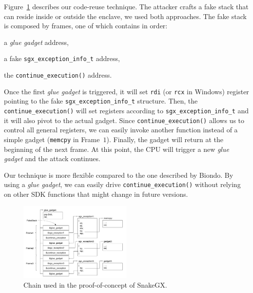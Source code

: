 Figure~\ref{fig:flavio-enclave-chain} describes our code-reuse technique.
The attacker crafts a fake stack that can reside inside or outside the enclave,
we used both approaches. The fake stack is composed by frames, one of which contains in order:
\begin{enumerate*}[label=(\roman*)]
	\item a \emph{glue gadget} address,
	\item a fake \texttt{sgx\_exception\_info\_t} address,
	\item the \texttt{continue\_execution()} address.
\end{enumerate*}
Once the first \emph{glue gadget} is triggered, it will set \texttt{rdi} (or \texttt{rcx} in Windows) register pointing to the fake \texttt{sgx\_exception\_info\_t} structure.
Then, the \texttt{continue\_execution()} will set registers according to \texttt{sgx\_exception\_info\_t} 
and it will also pivot to the actual gadget.
Since \texttt{continue\_execution()} allows us to control all general registers,
we can easily invoke another function instead of a simple gadget (\eg \texttt{memcpy} in Frame~$1$).
Finally, the gadget will return at the beginning of the next frame.
At this point, the CPU will trigger a new \emph{glue gadget} and the attack continues.

Our technique is more flexible compared to the one described by Biondo.
By using a \emph{glue gadget}, we can easily drive \texttt{continue\_execution()} without
relying on other SDK functions that might change in future versions.

\begin{figure}[t]
	\centering
	\includegraphics[width=0.5\textwidth]{fig_c5/flavio-enclave-chain.pdf}
	\caption{Chain used in the proof-of-concept of SnakeGX.}
	\label{fig:flavio-enclave-chain}
\end{figure}